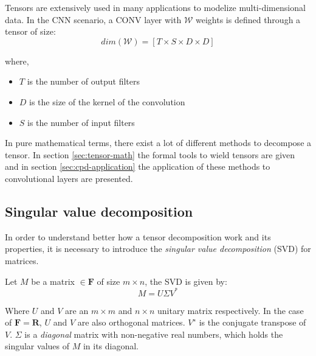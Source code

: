 Tensors are extensively used in many applications \parencite{WTensor} to modelize multi-dimensional data. In the CNN scenario, a CONV layer with $\mathcal{W}$ weights is defined through a tensor of size: 
\begin{equation}
\label{eq:conv-tensor}
  dim(\mathcal{W})  = [T \times S \times D \times D]
\end{equation}

where, 
\begin{itemize}
 \item $T$ is the number of output filters
 \item $D$ is the size of the kernel of the convolution 
 \item $S$ is the number of input filters 
\end{itemize}

In pure mathematical terms, there exist a lot of different methods to decompose a tensor. In section \ref{sec:tensor-math} the formal tools to wield tensors are given and in section \ref{sec:cpd-application}  the application of these methods to convolutional layers are presented. 

\subsection{Singular value decomposition}
In order to understand better how a tensor decomposition work and its properties, it is necessary to introduce the \emph{singular value decomposition} (SVD) for matrices. 

Let $M$ be a matrix $\in \mathbf{F}$ of size $m \times n$, the SVD is given by:
\begin{equation}
\label{eq:svd}
   M = U \Sigma V^*
\end{equation}

Where $U$ and $V$ are an $m \times m$ and $n \times n$ unitary matrix respectively. In the case of $\mathbf{F}= \mathbf{R}$, $U$ and $V$ are also orthogonal matrices. $V^∗$ is the conjugate transpose of $V$.  $\Sigma$ is a \emph{diagonal} matrix with non-negative real numbers, which holds the singular values of $M$ in its diagonal. 


